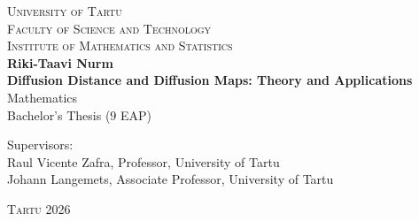\begin{titlepage}
\begin{center}

\textsc{\large{University of Tartu}}\\
\textsc{Faculty of Science and Technology}\\
\textsc{Institute of Mathematics and Statistics}\\[5.5cm]


{\large \textbf{Riki-Taavi Nurm}}\\
{\Large\bfseries Diffusion Distance and Diffusion Maps: Theory and Applications}\\
Mathematics\\
Bachelor's Thesis ($9$ EAP)\\

{\hfill Supervisors: \\
\hfill Raul Vicente Zafra, Professor, University of Tartu \\
\hfill Johann Langemets, Associate Professor, University of Tartu}




\textsc{Tartu 2026}
\end{center}
\end{titlepage}
